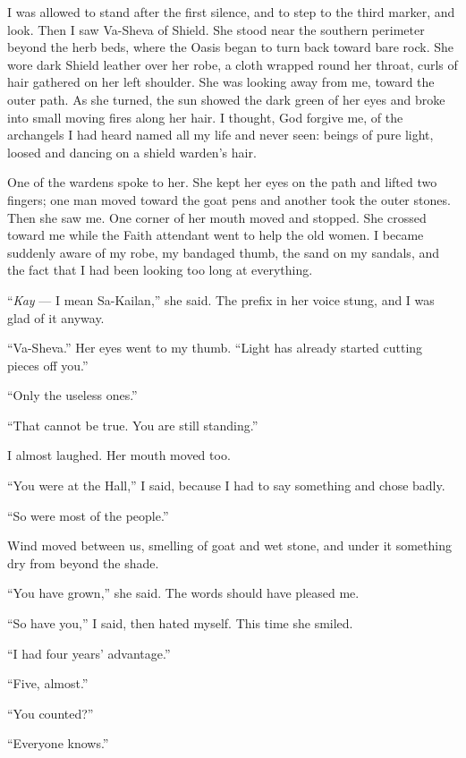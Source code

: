 I was allowed to stand after the first silence, and to step to the third marker, and look. Then I saw Va-Sheva of Shield. She stood near the southern perimeter beyond the herb beds, where the Oasis began to turn back toward bare rock. She wore dark Shield leather over her robe, a cloth wrapped round her throat, curls of hair gathered on her left shoulder. She was looking away from me, toward the outer path. As she turned, the sun showed the dark green of her eyes and broke into small moving fires along her hair. I thought, God forgive me, of the archangels I had heard named all my life and never seen: beings of pure light, loosed and dancing on a shield warden's hair. \par

One of the wardens spoke to her. She kept her eyes on the path and lifted two fingers; one man moved toward the goat pens and another took the outer stones. Then she saw me. One corner of her mouth moved and stopped. She crossed toward me while the Faith attendant went to help the old women. I became suddenly aware of my robe, my bandaged thumb, the sand on my sandals, and the fact that I had been looking too long at everything.\par

``\textit{Kay} --- I mean Sa-Kailan,'' she said. The prefix in her voice stung, and I was glad of it anyway.\par
``Va-Sheva.'' 
Her eyes went to my thumb. ``Light has already started cutting pieces off you.''\par
``Only the useless ones.''\par
``That cannot be true. You are still standing.''\par

I almost laughed. Her mouth moved too.\par

``You were at the Hall,'' I said, because I had to say something and chose badly.\par
``So were most of the people.''\par

Wind moved between us, smelling of goat and wet stone, and under it something dry from beyond the shade. \par

``You have grown,'' she said. The words should have pleased me. \par
``So have you,'' I said, then hated myself. This time she smiled.\par

``I had four years' advantage.''\par
``Five, almost.''\par
``You counted?''\par
``Everyone knows.'' \par

